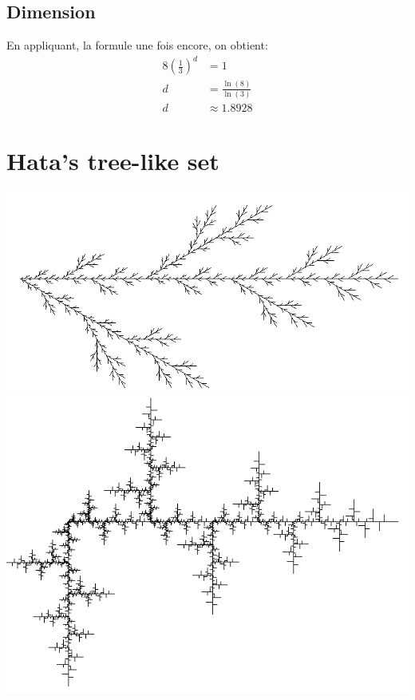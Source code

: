 \documentclass[a4paper, 12pt]{report}
\begin{document}
			\subsection{Dimension}
				En appliquant, la formule une fois encore, on obtient:
				\begin{align*}
					 8\left(\frac{1}{3}\right)^d	&=1\\
												d	&=\frac{\ln(8)}{\ln(3)}\\
												d	&\approx 1.8928
				\end{align*}
\newpage
		\section{Hata's tree-like set}
			\begin{center}
				\includegraphics[scale=0.3]{Images/hata1}
				\includegraphics[scale=0.3]{Images/hata2}
			\end{center}
\end{document}
